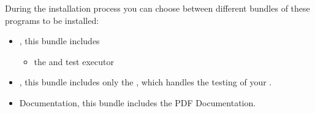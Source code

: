 During the installation process you can choose between different bundles of these programs to be installed:

\begin{itemize}
\item \app{}, this bundle includes
	\begin{itemize}
	\item the \ite{} and test executor
	\end{itemize}
\item \gdagent{}, this bundle includes only the \gdagent{}, which handles the testing
of your \gdaut{}.
\item \app{} Documentation, this bundle includes the PDF Documentation.
\end{itemize}


 
